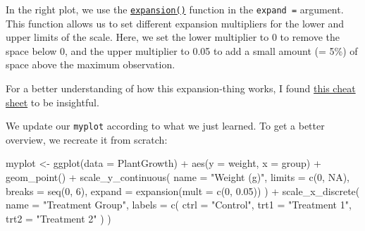 \documentclass[
  letterpaper,
  DIV=11,
  numbers=noendperiod]{scrartcl}
\newenvironment{Shaded}{\begin{snugshade}}{\end{snugshade}}
\newcommand{\AttributeTok}[1]{\textcolor[rgb]{0.40,0.45,0.13}{#1}}
\newcommand{\ConstantTok}[1]{\textcolor[rgb]{0.56,0.35,0.01}{#1}}
\newcommand{\DecValTok}[1]{\textcolor[rgb]{0.68,0.00,0.00}{#1}}
\newcommand{\FloatTok}[1]{\textcolor[rgb]{0.68,0.00,0.00}{#1}}
\newcommand{\FunctionTok}[1]{\textcolor[rgb]{0.28,0.35,0.67}{#1}}
\newcommand{\NormalTok}[1]{\textcolor[rgb]{0.00,0.23,0.31}{#1}}
\newcommand{\OtherTok}[1]{\textcolor[rgb]{0.00,0.23,0.31}{#1}}
\newcommand{\SpecialCharTok}[1]{\textcolor[rgb]{0.37,0.37,0.37}{#1}}
\newcommand{\StringTok}[1]{\textcolor[rgb]{0.13,0.47,0.30}{#1}}
\begin{document}
In the right plot, we use the
\href{https://ggplot2.tidyverse.org/reference/expansion.html}{\texttt{expansion()}}
function in the \texttt{expand\ =} argument. This function allows us to
set different expansion multipliers for the lower and upper limits of
the scale. Here, we set the lower multiplier to 0 to remove the space
below 0, and the upper multiplier to 0.05 to add a small amount (= 5\%)
of space above the maximum observation.

\begin{tcolorbox}[enhanced jigsaw, left=2mm, title=\textcolor{quarto-callout-tip-color}{\faLightbulb}\hspace{0.5em}{Tip}, toprule=.15mm, colback=white, coltitle=black, opacityback=0, breakable, titlerule=0mm, bottomtitle=1mm, toptitle=1mm, colbacktitle=quarto-callout-tip-color!10!white, arc=.35mm, rightrule=.15mm, bottomrule=.15mm, leftrule=.75mm, colframe=quarto-callout-tip-color-frame, opacitybacktitle=0.6]

For a better understanding of how this expansion-thing works, I found
\href{https://twitter.com/ChBurkhart/status/1492087527511052290}{this
cheat sheet} to be insightful.

\end{tcolorbox}

We update our \texttt{myplot} according to what we just learned. To get
a better overview, we recreate it from scratch:

\begin{Shaded}
\begin{Highlighting}[]
\NormalTok{myplot }\OtherTok{\textless{}{-}} \FunctionTok{ggplot}\NormalTok{(}\AttributeTok{data =}\NormalTok{ PlantGrowth) }\SpecialCharTok{+}
  \FunctionTok{aes}\NormalTok{(}\AttributeTok{y =}\NormalTok{ weight, }\AttributeTok{x =}\NormalTok{ group) }\SpecialCharTok{+}
  \FunctionTok{geom\_point}\NormalTok{() }\SpecialCharTok{+}
  \FunctionTok{scale\_y\_continuous}\NormalTok{(}
    \AttributeTok{name =} \StringTok{"Weight (g)"}\NormalTok{,}
    \AttributeTok{limits =} \FunctionTok{c}\NormalTok{(}\DecValTok{0}\NormalTok{, }\ConstantTok{NA}\NormalTok{),}
    \AttributeTok{breaks =} \FunctionTok{seq}\NormalTok{(}\DecValTok{0}\NormalTok{, }\DecValTok{6}\NormalTok{),}
    \AttributeTok{expand =} \FunctionTok{expansion}\NormalTok{(}\AttributeTok{mult =} \FunctionTok{c}\NormalTok{(}\DecValTok{0}\NormalTok{, }\FloatTok{0.05}\NormalTok{))}
\NormalTok{  ) }\SpecialCharTok{+}
  \FunctionTok{scale\_x\_discrete}\NormalTok{(}
    \AttributeTok{name =} \StringTok{"Treatment Group"}\NormalTok{,}
    \AttributeTok{labels =} \FunctionTok{c}\NormalTok{(}
      \AttributeTok{ctrl =} \StringTok{"Control"}\NormalTok{, }
      \AttributeTok{trt1 =} \StringTok{"Treatment 1"}\NormalTok{, }
      \AttributeTok{trt2 =} \StringTok{"Treatment 2"}
\NormalTok{    )}
\NormalTok{  )}
\end{Highlighting}
\end{Shaded}
\end{document}
